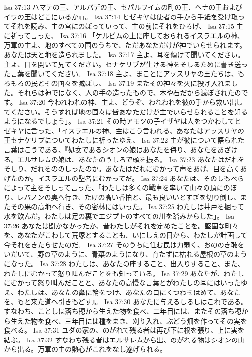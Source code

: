 Isa 37:13  ハマテの王、アルパデの王、セパルワイムの町の王、ヘナの王およびイワの王はどこにいるか』」。
Isa 37:14  ヒゼキヤは使者の手から手紙を受け取ってそれを読み、主の宮にのぼっていって、主の前にそれをひろげ、
Isa 37:15  主に祈って言った、
Isa 37:16  「ケルビムの上に座しておられるイスラエルの神、万軍の主よ、地のすべての国のうちで、ただあなただけが神でいらせられます。あなたは天と地を造られました。
Isa 37:17  主よ、耳を傾けて聞いてください。主よ、目を開いて見てください。セナケリブが生ける神をそしるために書き送った言葉を聞いてください。
Isa 37:18  主よ、まことにアッスリヤの王たちは、もろもろの民とその国々を滅ぼし、
Isa 37:19  またその神々を火に投げ入れました。それらは神ではなく、人の手の造ったもので、木や石だから滅ぼされたのです。
Isa 37:20  今われわれの神、主よ、どうぞ、われわれを彼の手から救い出してください。そうすれば地の国々は皆あなただけが主でいらせられることを知るようになるでしょう」。
Isa 37:21  その時アモツの子イザヤは人をつかわしてヒゼキヤに言った、「イスラエルの神、主はこう言われる、あなたはアッスリヤの王セナケリブについてわたしに祈ったゆえ、
Isa 37:22  主が彼について語られた言葉はこうである、『処女であるシオンの娘はあなたを侮り、あなたをあざける。エルサレムの娘は、あなたのうしろで頭を振る。
Isa 37:23  あなたはだれをそしり、だれをののしったのか。あなたはだれにむかって声をあげ、目を高くあげたのか。イスラエルの聖者にむかってだ。
Isa 37:24  あなたは、そのしもべらによって主をそしって言った、「わたしは多くの戦車を率いて山々の頂にのぼり、レバノンの奥へ行き、たけの高い香柏と、最も良いいとすぎを切り倒し、またその果の高地へ行き、その密林にはいった。
Isa 37:25  わたしは井戸を掘って水を飲んだ。わたしは足の裏でエジプトのすべての川を踏みからした」。
Isa 37:26  あなたは聞かなかったか、昔わたしがそれを定めたことを。堅固な町々を、あなたがこわして荒塚とすることも、いにしえの日から、わたしが計画して今それをきたらせたのだ。
Isa 37:27  そのうちに住む民は力弱く、おののき恥をいだいて、野の草のように、青菜のようになり、育たずに枯れる屋根の草のようになった。
Isa 37:28  わたしは、あなたの座すること、出入りすること、また、わたしにむかって怒り叫んだことをも知っている。
Isa 37:29  あなたが、わたしにむかって怒り叫んだことと、あなたの高慢な言葉とがわたしの耳にはいったゆえ、わたしは、あなたの鼻に輪をつけ、あなたの口にくつわをはめて、あなたを、もと来た道へ引きもどす』。
Isa 37:30  あなたに与えるしるしはこれである。すなわち、ことしは落ち穂から生えた物を食べ、二年目には、またその落ち穂から生えた物を食べ、三年目には種をまき、刈り入れ、ぶどう畑を作ってその実を食べる。
Isa 37:31  ユダの家の、のがれて残る者は再び下に根を張り、上に実を結ぶ。
Isa 37:32  すなわち残る者はエルサレムから出、のがれる物はシオンの山から出る。万軍の主の熱心がこれをなし遂げられる。
